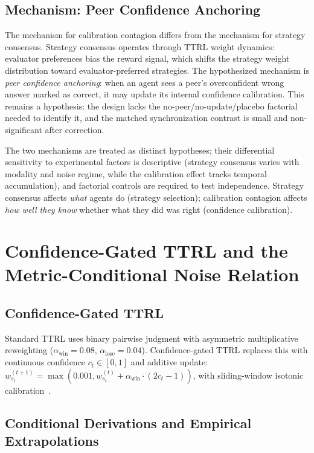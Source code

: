 \documentclass[11pt]{article}
\begin{document}
\subsection{Mechanism: Peer Confidence Anchoring}

The mechanism for calibration contagion differs from the mechanism for strategy consensus. Strategy consensus operates through TTRL weight dynamics: evaluator preferences bias the reward signal, which shifts the strategy weight distribution toward evaluator-preferred strategies. The hypothesized mechanism is \textit{peer confidence anchoring}: when an agent sees a peer's overconfident wrong answer marked as correct, it may update its internal confidence calibration. This remains a hypothesis: the design lacks the no-peer/no-update/placebo factorial needed to identify it, and the matched synchronization contrast is small and non-significant after correction.

The two mechanisms are treated as distinct hypotheses; their differential sensitivity to experimental factors is descriptive (strategy consensus varies with modality and noise regime, while the calibration effect tracks temporal accumulation), and factorial controls are required to test independence. Strategy consensus affects \textit{what} agents do (strategy selection); calibration contagion affects \textit{how well they know} whether what they did was right (confidence calibration).

\section{Confidence-Gated TTRL and the Metric-Conditional Noise Relation}

\subsection{Confidence-Gated TTRL}

Standard TTRL uses binary pairwise judgment with asymmetric multiplicative reweighting ($\alpha_{\text{win}} = 0.08$, $\alpha_{\text{lose}} = 0.04$). Confidence-gated TTRL replaces this with continuous confidence $c_t \in [0,1]$ and additive update: $w_{s_t}^{(t+1)} = \max(0.001, w_{s_t}^{(t)} + \alpha_{\text{win}} \cdot (2c_t - 1))$, with sliding-window isotonic calibration~\citep{niculescu2005predicting}.

\subsection{Conditional Derivations and Empirical Extrapolations}
\end{document}
